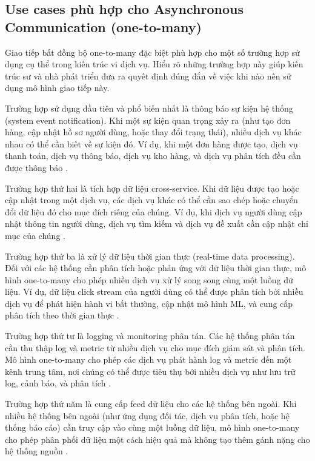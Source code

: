 \subsection{Use cases phù hợp cho Asynchronous Communication (one-to-many)}
Giao tiếp bất đồng bộ one-to-many đặc biệt phù hợp cho một số trường hợp sử dụng cụ thể trong kiến trúc vi dịch vụ. Hiểu rõ những trường hợp này giúp kiến trúc sư và nhà phát triển đưa ra quyết định đúng đắn về việc khi nào nên sử dụng mô hình giao tiếp này.

Trường hợp sử dụng đầu tiên và phổ biến nhất là thông báo sự kiện hệ thống (system event notification). Khi một sự kiện quan trọng xảy ra (như tạo đơn hàng, cập nhật hồ sơ người dùng, hoặc thay đổi trạng thái), nhiều dịch vụ khác nhau có thể cần biết về sự kiện đó. Ví dụ, khi một đơn hàng được tạo, dịch vụ thanh toán, dịch vụ thông báo, dịch vụ kho hàng, và dịch vụ phân tích đều cần được thông báo \cite{newman2015}.

Trường hợp thứ hai là tích hợp dữ liệu cross-service. Khi dữ liệu được tạo hoặc cập nhật trong một dịch vụ, các dịch vụ khác có thể cần sao chép hoặc chuyển đổi dữ liệu đó cho mục đích riêng của chúng. Ví dụ, khi dịch vụ người dùng cập nhật thông tin người dùng, dịch vụ tìm kiếm và dịch vụ đề xuất cần cập nhật chỉ mục của chúng \cite{richardson2019}.

Trường hợp thứ ba là xử lý dữ liệu thời gian thực (real-time data processing). Đối với các hệ thống cần phân tích hoặc phản ứng với dữ liệu thời gian thực, mô hình one-to-many cho phép nhiều dịch vụ xử lý song song cùng một luồng dữ liệu. Ví dụ, dữ liệu click stream của người dùng có thể được phân tích bởi nhiều dịch vụ để phát hiện hành vi bất thường, cập nhật mô hình ML, và cung cấp phân tích theo thời gian thực \cite{goodhope2012}.

Trường hợp thứ tư là logging và monitoring phân tán. Các hệ thống phân tán cần thu thập log và metric từ nhiều dịch vụ cho mục đích giám sát và phân tích. Mô hình one-to-many cho phép các dịch vụ phát hành log và metric đến một kênh trung tâm, nơi chúng có thể được tiêu thụ bởi nhiều dịch vụ như lưu trữ log, cảnh báo, và phân tích \cite{aksakalli2021}.

Trường hợp thứ năm là cung cấp feed dữ liệu cho các hệ thống bên ngoài. Khi nhiều hệ thống bên ngoài (như ứng dụng đối tác, dịch vụ phân tích, hoặc hệ thống báo cáo) cần truy cập vào cùng một luồng dữ liệu, mô hình one-to-many cho phép phân phối dữ liệu một cách hiệu quả mà không tạo thêm gánh nặng cho hệ thống nguồn \cite{beyer2018}.

